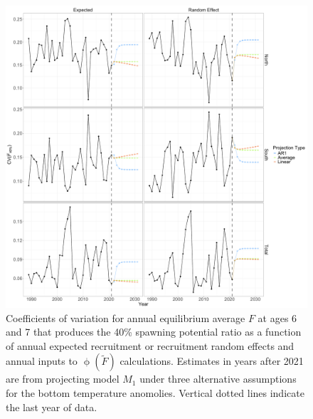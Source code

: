 \documentclass[
]{article}
\begin{document}
\begin{figure}

{\centering \includegraphics[height=0.95\textheight]{proj_F40_CV} 

}

\caption{Coefficients of variation for annual equilibrium average $F$ at ages 6 and 7 that produces the 40\% spawning potential ratio as a function of annual expected recruitment or recruitment random effects and annual inputs to $\upphi(\widetilde{F})$ calculations. Estimates in years after 2021 are from projecting model $M_1$ under three alternative assumptions for the bottom temperature anomolies. Vertical dotted lines indicate the last year of data.}\label{fig:annual-F40-cvs}
\end{figure}
\end{document}
